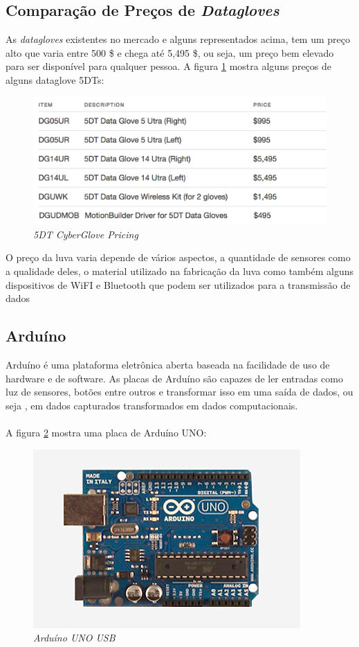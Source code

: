 \documentclass[12pt]{article}
\begin{document}
\subsection{Comparação de Preços de \textit{Datagloves}}

As \textit{datagloves} existentes no mercado e alguns representados acima, tem um preço alto que varia entre 500 \$ e chega até 5,495 \$,  ou seja,  um preço bem elevado para ser disponível para qualquer pessoa. A figura \ref{fig:pricing} mostra alguns preços de alguns dataglove 5DTs:

\begin{figure}[H]
    \centering
    \includegraphics[width=.7\textwidth]{images/pricing.png}
    \caption{\textit{5DT CyberGlove Pricing}}
    \label{fig:pricing}
\end{figure}

O preço da luva varia depende de vários aspectos, a quantidade de sensores como a qualidade deles, o material utilizado na fabricação da luva como também alguns dispositivos de WiFI e Bluetooth que podem ser utilizados para a transmissão de dados \cite{Pereira_2013}

\subsection{Arduíno}

Arduíno é uma plataforma eletrônica aberta baseada na facilidade de uso de hardware e de software. As placas de Arduíno são capazes de ler entradas como luz de sensores, botões entre outros e transformar isso em uma saída de dados, ou seja , em dados capturados transformados em dados computacionais.\\
\\A figura \ref{fig:arduinoUno} mostra uma placa de Arduíno UNO:

\begin{figure}[H]
    \centering
    \includegraphics[width=.7\textwidth]{images/ArduinoUnoFront240.jpg}
    \caption{\textit{Arduíno UNO USB}}
    \label{fig:arduinoUno}
\end{figure}
\end{document}
